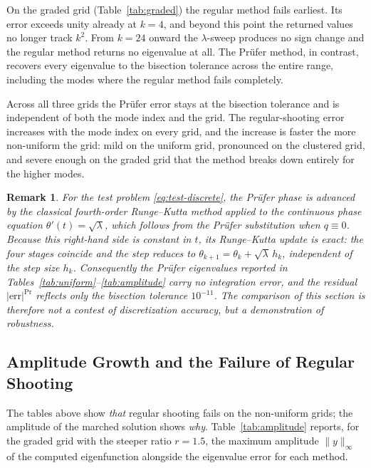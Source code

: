 \documentclass[12pt,reqno]{amsart}
\newtheorem{rem}[thm]{Remark}
\numberwithin{equation}{section}
\begin{document}
On the graded grid (Table~\ref{tab:graded}) the regular method fails earliest. Its error exceeds unity already at $k=4$, and beyond this point the returned values no longer track $k^2$. From $k = 24$ onward the $\lambda$-sweep produces no sign change and the regular method returns no eigenvalue at all. The Pr\"ufer method, in contrast, recovers every eigenvalue to the bisection tolerance across the entire range, including the modes where the regular method fails completely.

Across all three grids the Pr\"ufer error stays at the bisection tolerance and is independent of both the mode index and the grid. The regular-shooting error increases with the mode index on every grid, and the increase is faster the more non-uniform the grid: mild on the uniform grid, pronounced on the clustered grid, and severe enough on the graded grid that the method breaks down entirely for the higher modes.

\begin{rem}{\rm
For the test problem \eqref{eq:test-discrete}, the Pr\"ufer phase is advanced by the classical
fourth-order Runge--Kutta method applied to the continuous phase equation
$\theta'(t) = \sqrt{\lambda}$, which follows from the Pr\"ufer substitution when $q \equiv 0$.
Because this right-hand side is constant in $t$, its Runge--Kutta update is exact: the four
stages coincide and the step reduces to $\theta_{k+1} = \theta_k + \sqrt{\lambda}\,h_k$,
independent of the step size $h_k$. Consequently the Pr\"ufer eigenvalues reported in
Tables~\ref{tab:uniform}--\ref{tab:amplitude} carry no integration error, and the residual
$|\text{err}|^{\text{Pr}}$ reflects only the bisection tolerance $10^{-11}$. The comparison
of this section is therefore not a contest of discretization accuracy, but a demonstration of
robustness.}
\end{rem}

\subsection{Amplitude Growth and the Failure of Regular Shooting}
\label{subsec:amplitude}
The tables above show \emph{that} regular shooting fails on the non-uniform grids; the amplitude of the marched solution shows \emph{why}. Table~\ref{tab:amplitude} reports, for the graded grid with the steeper ratio $r = 1.5$, the maximum amplitude $\|y\|_\infty$ of the computed eigenfunction alongside the eigenvalue error for each method.
\end{document}
